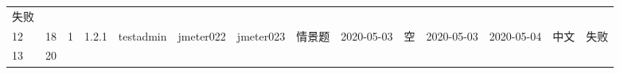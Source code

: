 \documentclass[hyperref, a4paper]{ctexart}
\begin{document}
\begin{longtable}[]{@{}llllllllllllll@{}}
\begin{minipage}[t]{0.02\columnwidth}
失败\strut
\end{minipage}\tabularnewline
\begin{minipage}[t]{0.01\columnwidth}\raggedright
12\strut
\end{minipage} & \begin{minipage}[t]{0.12\columnwidth}\raggedright
18\strut
\end{minipage} & \begin{minipage}[t]{0.03\columnwidth}\raggedright
1\strut
\end{minipage} & \begin{minipage}[t]{0.06\columnwidth}\raggedright
1.2.1\strut
\end{minipage} & \begin{minipage}[t]{0.04\columnwidth}\raggedright
testadmin\strut
\end{minipage} & \begin{minipage}[t]{0.04\columnwidth}\raggedright
jmeter022\strut
\end{minipage} & \begin{minipage}[t]{0.04\columnwidth}\raggedright
jmeter023\strut
\end{minipage} & \begin{minipage}[t]{0.02\columnwidth}\raggedright
情景题\strut
\end{minipage} & \begin{minipage}[t]{0.04\columnwidth}\raggedright
2020-05-03\strut
\end{minipage} & \begin{minipage}[t]{0.05\columnwidth}\raggedright
空\strut
\end{minipage} & \begin{minipage}[t]{0.07\columnwidth}\raggedright
2020-05-03\strut
\end{minipage} & \begin{minipage}[t]{0.08\columnwidth}\raggedright
2020-05-04\strut
\end{minipage} & \begin{minipage}[t]{0.04\columnwidth}\raggedright
中文\strut
\end{minipage} & \begin{minipage}[t]{0.02\columnwidth}\raggedright
失败\strut
\end{minipage}\tabularnewline
\begin{minipage}[t]{0.01\columnwidth}\raggedright
13\strut
\end{minipage} & \begin{minipage}[t]{0.12\columnwidth}\raggedright
20\strut
\end{minipage} & \begin{minipage}[t]{0.03\columnwidth}\raggedright

\end{minipage}
\end{longtable}
\end{document}
